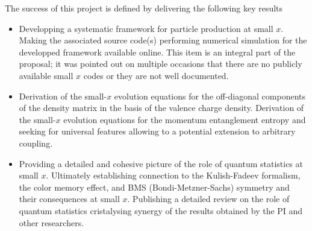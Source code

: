 The success of this project is defined by delivering the following key results 
\begin{itemize}
    \item Developping a systematic framework for particle production at 
		small $x$. Making the associated source code(s) performing numerical simulation for 
		the developped framework available online. This item is an integral part 
		of the proposal; it was pointed out on multiple occasions that 
		there are no publicly available small $x$ codes or they are not well 
		documented. 
    \item Derivation of the 
		small-$x$ evolution equations for the off-diagonal components 
		of the density matrix in the basis of the valence charge density.
		Derivation of the small-$x$ evolution equations for the momentum 
		entanglement entropy and seeking for universal features allowing to 
		a potential extension to arbitrary coupling.  
    \item Providing a detailed and cohesive picture of the role of 
		quantum statistics at small $x$. Ultimately establishing 
		connection to 
		the Kulish-Fadeev formalism, the color memory effect, and 
		BMS (Bondi-Metzner-Sachs) symmetry and their consequences at small $x$.   
		Publishing a detailed review on the role of quantum statistics 
		cristalysing synergy of the results obtained by the PI and 
		other researchers. 
\end{itemize}

